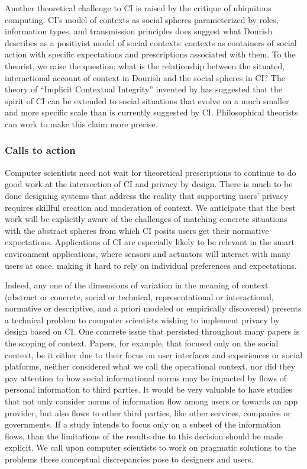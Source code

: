 \documentclass[../thesis.tex]{subfiles}
\begin{document}
Another theoretical challenge to CI is raised by
the \citet{dourish2004we} critique of ubiquitous computing.
CI's model of contexts as social spheres parameterized
by roles, information types, and transmission principles does suggest
what Dourish describes as a positivist model of social contexts:
contexts as containers of social action with specific
expectations and
prescriptions associated with them. To the theorist, we raise the
question: what is the relationship between the situated,
interactional
account of context in Dourish and the social spheres in CI?
The theory
of ``Implicit Contextual Integrity''
invented by \citet{criado2015implicit} has suggested that the
spirit of CI
can be extended to social situations that evolve on a much
smaller and
more specific scale than is currently suggested by CI.
Philosophical
theorists can work to make this claim more precise.

\subsubsection{Calls to action}
\label{CI5.2.2}

Computer scientists need not wait for theoretical prescriptions to
continue to do good work at the intersection of CI and privacy by
design. There is much to be done designing systems that address the
reality that supporting users' privacy requires skillful creation and
moderation of context. We anticipate that the best work will be
explicitly aware of the challenges of matching concrete situations with
the abstract spheres from which CI posits users get their normative
expectations. Applications of CI are especially likely to be relevant
in the smart environment applications, where sensors and actuators will
interact with many users at once, making it hard to rely on individual
preferences and expectations. 

Indeed, any one of the dimensions of variation in the meaning of context
(abstract or concrete, social or technical, representational or
interactional, normative or descriptive, and a priori modeled or
empirically discovered) presents a technical problem to computer
scientists wishing to implement privacy by design based on CI. One
concrete issue that persisted throughout many papers is the scoping of
context. Papers, for example, that focused only on the social context,
be it either due to their focus on user interfaces and experiences or
social platforms, neither considered what we call the operational
context, nor did they pay attention to how social informational norms
may be impacted by flows of personal information to third parties. It
would be very valuable to have studies that not only consider norms of
information flow among users or towards an app provider, but also flows
to other third parties, like other services, companies or governments.
If a study intends to focus only on a subset of the information flows,
than the limitations of the results due to this decision should be made
explicit. We call upon computer scientists to work on pragmatic
solutions to the problems these conceptual discrepancies pose to
designers and users.
\end{document}
